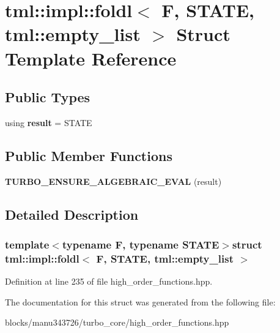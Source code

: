 \hypertarget{structtml_1_1impl_1_1foldl_3_01_f_00_01_s_t_a_t_e_00_01tml_1_1empty__list_01_4}{\section{tml\+:\+:impl\+:\+:foldl$<$ F, S\+T\+A\+T\+E, tml\+:\+:empty\+\_\+list $>$ Struct Template Reference}
\label{structtml_1_1impl_1_1foldl_3_01_f_00_01_s_t_a_t_e_00_01tml_1_1empty__list_01_4}
}
\subsection*{Public Types}
\begin{DoxyCompactItemize}
\item 
\hypertarget{structtml_1_1impl_1_1foldl_3_01_f_00_01_s_t_a_t_e_00_01tml_1_1empty__list_01_4_a5071702ae4c92b3a0c0b079d2bfafa45}{using {\bfseries result} = S\+T\+A\+T\+E}\label{structtml_1_1impl_1_1foldl_3_01_f_00_01_s_t_a_t_e_00_01tml_1_1empty__list_01_4_a5071702ae4c92b3a0c0b079d2bfafa45}

\end{DoxyCompactItemize}
\subsection*{Public Member Functions}
\begin{DoxyCompactItemize}
\item 
\hypertarget{structtml_1_1impl_1_1foldl_3_01_f_00_01_s_t_a_t_e_00_01tml_1_1empty__list_01_4_ade1b5f01c79c52a87aae3383ab2aede6}{{\bfseries T\+U\+R\+B\+O\+\_\+\+E\+N\+S\+U\+R\+E\+\_\+\+A\+L\+G\+E\+B\+R\+A\+I\+C\+\_\+\+E\+V\+A\+L} (result)}\label{structtml_1_1impl_1_1foldl_3_01_f_00_01_s_t_a_t_e_00_01tml_1_1empty__list_01_4_ade1b5f01c79c52a87aae3383ab2aede6}

\end{DoxyCompactItemize}


\subsection{Detailed Description}
\subsubsection*{template$<$typename F, typename S\+T\+A\+T\+E$>$struct tml\+::impl\+::foldl$<$ F, S\+T\+A\+T\+E, tml\+::empty\+\_\+list $>$}



Definition at line 235 of file high\+\_\+order\+\_\+functions.\+hpp.



The documentation for this struct was generated from the following file\+:\begin{DoxyCompactItemize}
\item 
blocks/manu343726/turbo\+\_\+core/high\+\_\+order\+\_\+functions.\+hpp\end{DoxyCompactItemize}
